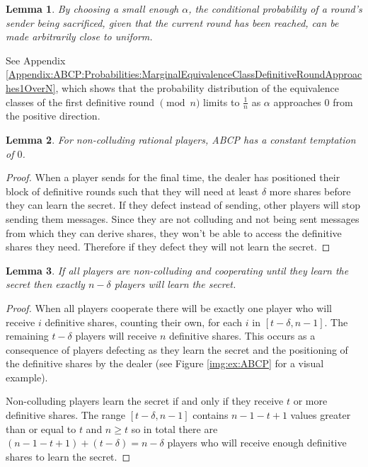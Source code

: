 \documentclass{dalcsthesis}
\newtheorem{lemma}{Lemma}
\begin{document}
\begin{lemma}\label{Lem:ABCP:FairerDuringWithSmallAlpha}By choosing a small enough $\alpha$, the conditional probability of a round's sender being sacrificed, given that the current round has been reached, can be made arbitrarily close to uniform.\end{lemma}
See Appendix \ref{Appendix:ABCP:Probabilities:MarginalEquivalenceClassDefinitiveRoundApproaches1OverN}, which shows that the probability distribution of the equivalence classes of the first definitive round $\pmod{n}$ limits to $\frac{1}{n}$ as $\alpha$ approaches $0$ from the positive direction.

\begin{lemma}\label{Lem:ABCP:SoloTemptNone}For non-colluding rational players, ABCP has a constant temptation of $0$.\end{lemma}
\begin{proof}
When a player sends for the final time, the dealer has positioned their block of definitive rounds such that they will need at least $\delta$ more shares before they can learn the secret. If they defect instead of sending, other players will stop sending them messages. Since they are not colluding and not being sent messages from which they can derive shares, they won't be able to access the definitive shares they need. Therefore if they defect they will not learn the secret.
\end{proof}

\begin{lemma}\label{Lem:ABCP:AllDeltaLose}If all players are non-colluding and cooperating until they learn the secret then exactly $n-\delta$ players will learn the secret.\end{lemma}
\begin{proof}
When all players cooperate there will be exactly one player who will receive $i$ definitive shares, counting their own, for each $i$ in $[t-\delta, n-1]$. The remaining $t-\delta$ players will receive $n$ definitive shares. This occurs as a consequence of players defecting as they learn the secret and the positioning of the definitive shares by the dealer (see Figure \ref{img:ex:ABCP} for a visual example).

Non-colluding players learn the secret if and only if they receive $t$ or more definitive shares. The range $[t-\delta, n-1]$ contains $n-1-t+1$ values greater than or equal to $t$ and $n \geq t$ so in total there are $(n-1-t+1) + (t-\delta) = n-\delta$ players who will receive enough definitive shares to learn the secret.
\end{proof}
\end{document}
